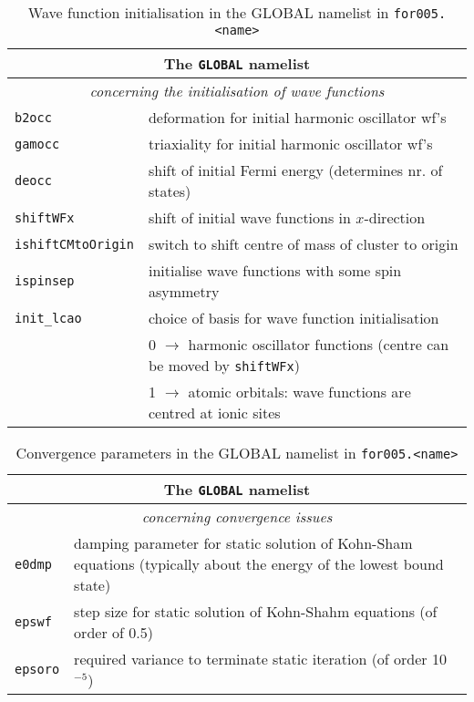 \documentclass[11pt,a4paper]{article}
\begin{document}
		\begin{table}[t]
			\caption{Wave function initialisation in the GLOBAL namelist in \texttt{for005.<name>}}\label{tab:input-params-wfs}
			\begin{tabular}{|p{3.5cm}|p{11.2cm}|}
				\hline
				\multicolumn{2}{|c|}{The \texttt{GLOBAL} namelist}\\
				\hline
				\multicolumn{2}{|c|}{\textit{\color{activeColor}concerning the initialisation of wave functions}} \\
				\hline
				\texttt{b2occ}& deformation for initial harmonic oscillator wf's\\
				\hline
				\texttt{gamocc}& triaxiality for initial harmonic oscillator wf's\\
				\hline
				\texttt{deocc}& shift of initial Fermi energy (determines nr. of
				states)\\
				\hline
				\texttt{shiftWFx}& shift of initial wave functions in $x$-direction \\
				\hline
				\texttt{ishiftCMtoOrigin}& switch to shift centre of mass of cluster to origin\\
				\hline
				\texttt{ispinsep}& initialise wave functions with some spin asymmetry\\
				\hline
				\texttt{init\_lcao}& choice of basis for wave function initialisation \\
				& 0 $\rightarrow$ harmonic oscillator functions (centre can be
				moved by \texttt{shiftWFx}) \\
				& 1 $\rightarrow$ atomic orbitals: wave functions are centred at ionic sites\\
				\hline
			\end{tabular}
		\end{table}

		\begin{table}[t]
			\caption{Convergence parameters in the GLOBAL namelist in \texttt{for005.<name>}}\label{tab:input-params-conv}
			\begin{tabular}{|p{3.5cm}|p{11.2cm}|}
				\hline
				\multicolumn{2}{|c|}{The \texttt{GLOBAL} namelist}\\
				\hline
				\multicolumn{2}{|c|}{\textit{\color{activeColor}concerning convergence issues}}\\
				\hline
				\texttt{e0dmp}& damping parameter for static solution of Kohn-Sham equations (typically about the energy of the lowest bound state)\\
				\hline
				\texttt{epswf}& step size for static solution of Kohn-Shahm equations (of order of 0.5)\\
				\hline
				\texttt{epsoro}& required variance to terminate static iteration (of order 10$^{-5}$)\\
				\hline
			\end{tabular}
		\end{table}
		
\end{document}

